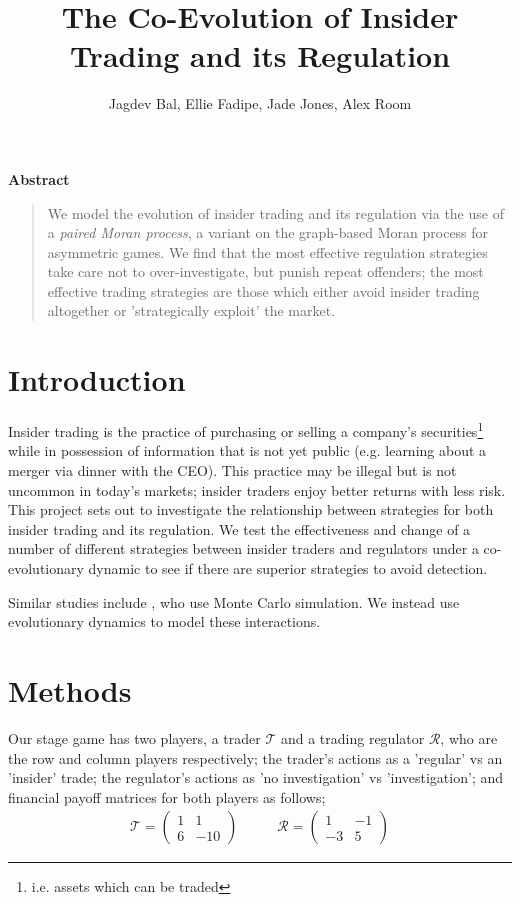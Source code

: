 \documentclass{article}
\title{The Co-Evolution of Insider Trading and its Regulation}
\author{Jagdev Bal, Ellie Fadipe, Jade Jones, Alex Room}
\date{}
\begin{document}
\maketitle
\textbf{Abstract} \begin{quotation}
We model the evolution of insider trading and its regulation via the use of a \emph{paired Moran process}, a variant on the graph-based Moran process for asymmetric games. We find that the most effective regulation strategies take care not to over-investigate, but punish repeat offenders; the most effective trading strategies are those which either avoid insider trading altogether or 'strategically exploit' the market.
\end{quotation}

\section{Introduction}
Insider trading is the practice of purchasing or selling a company’s securities\footnote{i.e. assets which can be traded} while in possession of information that is not yet public (e.g. learning about a merger via dinner with the CEO). This practice may be illegal but is not uncommon in today's markets; insider traders enjoy better returns with less risk. \citep{bainbridge1998insider} This project sets out to investigate the relationship between strategies for both insider trading and its regulation. We test the effectiveness and change of a number of different strategies between insider traders and regulators under a co-evolutionary dynamic to see if there are superior strategies to avoid detection. 

Similar studies include \citet{smales2017game}, who use Monte Carlo simulation. We instead use evolutionary dynamics to model these interactions.

\section{Methods}
Our stage game has two players, a trader $\mathcal{T}$ and a trading regulator $\mathcal{R}$, who are the row and column players respectively; the trader's actions as a 'regular' vs an 'insider' trade; the regulator's actions as 'no investigation' vs 'investigation'; and financial payoff matrices for both players as follows;
\begin{equation*}
\begin{split}
    \mathcal{T} = 
    \begin{pmatrix}
    1 & 1 \\
    6 & -10
    \end{pmatrix}
\end{split}
\quad\quad
\begin{split}
    \mathcal{R} = 
    \begin{pmatrix}
    1 & -1 \\
    -3 & 5
    \end{pmatrix}
\end{split}
\end{equation*}
\end{document}
